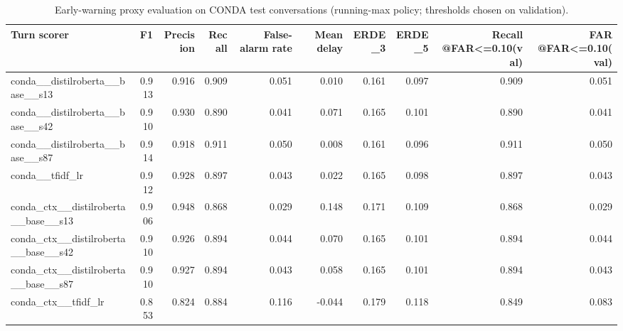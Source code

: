\begin{table}[t]
\centering
\small
\caption{Early-warning proxy evaluation on CONDA test conversations (running-max policy; thresholds chosen on validation).}
\label{tab:tab13_early_detection}
\begin{tabular}{lrrrrrrrrr}
\toprule
Turn scorer & F1 & Precision & Recall & False-alarm rate & Mean delay & ERDE\_3 & ERDE\_5 & Recall @FAR<=0.10(val) & FAR @FAR<=0.10(val) \\
\midrule
conda\_\_distilroberta\_\_base\_\_s13 & 0.913 & 0.916 & 0.909 & 0.051 & 0.010 & 0.161 & 0.097 & 0.909 & 0.051 \\
conda\_\_distilroberta\_\_base\_\_s42 & 0.910 & 0.930 & 0.890 & 0.041 & 0.071 & 0.165 & 0.101 & 0.890 & 0.041 \\
conda\_\_distilroberta\_\_base\_\_s87 & 0.914 & 0.918 & 0.911 & 0.050 & 0.008 & 0.161 & 0.096 & 0.911 & 0.050 \\
conda\_\_tfidf\_lr & 0.912 & 0.928 & 0.897 & 0.043 & 0.022 & 0.165 & 0.098 & 0.897 & 0.043 \\
conda\_ctx\_\_distilroberta\_\_base\_\_s13 & 0.906 & 0.948 & 0.868 & 0.029 & 0.148 & 0.171 & 0.109 & 0.868 & 0.029 \\
conda\_ctx\_\_distilroberta\_\_base\_\_s42 & 0.910 & 0.926 & 0.894 & 0.044 & 0.070 & 0.165 & 0.101 & 0.894 & 0.044 \\
conda\_ctx\_\_distilroberta\_\_base\_\_s87 & 0.910 & 0.927 & 0.894 & 0.043 & 0.058 & 0.165 & 0.101 & 0.894 & 0.043 \\
conda\_ctx\_\_tfidf\_lr & 0.853 & 0.824 & 0.884 & 0.116 & -0.044 & 0.179 & 0.118 & 0.849 & 0.083 \\
\bottomrule
\end{tabular}
\end{table}

